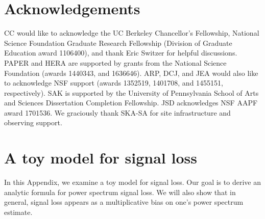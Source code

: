 \documentclass[preprint2,numberedappendix,tighten]{aastex6}  %
\begin{document}
\section{Acknowledgements}
CC would like to acknowledge the UC Berkeley Chancellor's Fellowship, National Science Foundation Graduate Research 
Fellowship (Division of Graduate Education award 1106400), and thank Eric Switzer for helpful discussions. PAPER and HERA 
are supported by grants from the National Science Foundation (awards 1440343, and 1636646). ARP, DCJ, and JEA would 
also like to acknowledge NSF support (awards 1352519, 1401708, and 1455151, respectively). SAK is supported by the University of Pennsylvania School of Arts and Sciences Dissertation Completion Fellowship. JSD acknowledges NSF AAPF
award 1701536. We graciously thank SKA-SA for site infrastructure and observing support.
\label{sec:Ack}


\appendix
\section{A toy model for signal loss}
\label{sec:sigloss_appendix}

In this Appendix, we examine a toy model for signal loss. Our goal is to derive an analytic formula for power spectrum signal loss. We will also show that in general, signal loss appears as a multiplicative bias on one's power spectrum estimate.
\end{document}
